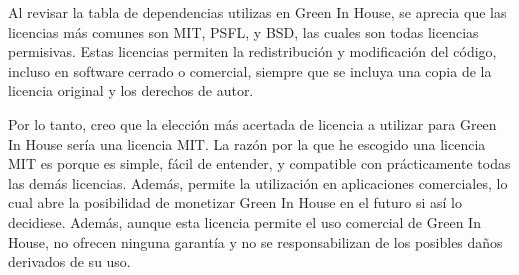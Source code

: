     Al revisar la tabla de dependencias utilizas en Green In House, se aprecia que las licencias más comunes son MIT, PSFL, y BSD, las cuales son todas licencias permisivas. Estas licencias permiten la redistribución y modificación del código, incluso en software cerrado o comercial, siempre que se incluya una copia de la licencia original y los derechos de autor. 
    
    Por lo tanto, creo que la elección más acertada de licencia a utilizar para Green In House sería una licencia MIT. La razón por la que he escogido una licencia MIT es porque es simple, fácil de entender, y compatible con prácticamente todas las demás licencias. Además, permite la utilización en aplicaciones comerciales, lo cual abre la posibilidad de monetizar Green In House en el futuro si así lo decidiese. Además, aunque esta licencia permite el uso comercial de Green In House, no ofrecen ninguna garantía y no se responsabilizan de los posibles daños derivados de su uso.
    

    
    
